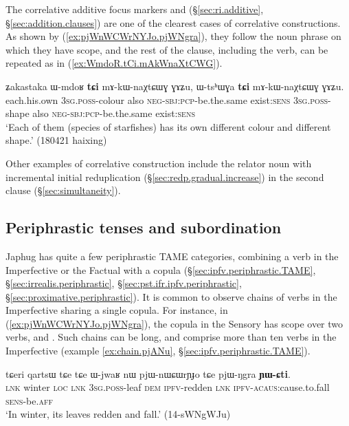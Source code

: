 The correlative additive focus markers  and  (§\ref{sec:ri.additive}, §\ref{sec:addition.clauses}) are one of the clearest cases of correlative constructions. As shown by (\ref{ex:pjWnWCWrNYJo.pjWNgra}), they follow the noun phrase on which they have scope, and the rest of the clause, including the verb, can be repeated as in (\ref{ex:WmdoR.tCi.mAkWnaXtCWG}).


\begin{exe}
\ex \label{ex:WmdoR.tCi.mAkWnaXtCWG}
\gll ʑakastaka ɯ-mdoʁ \textbf{tɕi} mɤ-kɯ-naχtɕɯɣ ɣɤʑu, ɯ-tsʰɯɣa \textbf{tɕi} mɤ-kɯ-naχtɕɯɣ ɣɤʑu. \\
each.his.own \textsc{3sg}.\textsc{poss}-colour also \textsc{neg}-\textsc{sbj}:\textsc{pcp}-be.the.same exist:\textsc{sens} \textsc{3sg}.\textsc{poss}-shape also \textsc{neg}-\textsc{sbj}:\textsc{pcp}-be.the.same exist:\textsc{sens} \\
\glt `Each of them (species of starfishes) has its own different colour and different shape.' (180421 haixing)
\end{exe}

Other examples of correlative construction include the relator noun  with incremental initial reduplication (§\ref{sec:redp.gradual.increase}) in the second clause (§\ref{sec:simultaneity}).

\subsection{Periphrastic tenses and subordination}   \label{sec:periphrastic.subordination}
Japhug has quite a few periphrastic TAME categories, combining a verb in the Imperfective or the Factual with a copula (§\ref{sec:ipfv.periphrastic.TAME}, §\ref{sec:irrealis.periphrastic}, §\ref{sec:pst.ifr.ipfv.periphrastic}, §\ref{sec:proximative.periphrastic}). It is common to observe chains of verbs in the Imperfective sharing a single copula. For instance, in (\ref{ex:pjWnWCWrNYJo.pjWNgra}), the copula  in the Sensory has scope over two verbs,  and . Such chains can be long, and comprise more than ten verbs in the Imperfective (example \ref{ex:chain.pjANu}, §\ref{sec:ipfv.periphrastic.TAME}).


\begin{exe}
\ex \label{ex:pjWnWCWrNYJo.pjWNgra}
\gll tɕeri qartsɯ tɕe tɕe ɯ-jwaʁ nɯ pjɯ-nɯɕɯrɲɟo tɕe pjɯ-ŋgra \textbf{ɲɯ-ɕti}. \\
\textsc{lnk} winter \textsc{loc} \textsc{lnk} \textsc{3sg}.\textsc{poss}-leaf \textsc{dem} \textsc{ipfv}-redden \textsc{lnk} \textsc{ipfv}-\textsc{acaus}:cause.to.fall \textsc{sens}-be.\textsc{aff} \\
\glt `In winter, its leaves redden and fall.' (14-sWNgWJu)
\end{exe}   

